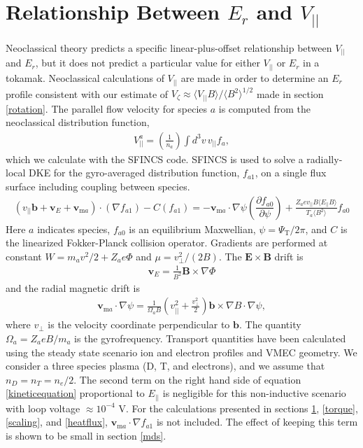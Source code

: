\documentclass[aip, pop, preprint]{revtex4-1}
\numberwithin{figure}{section}
\numberwithin{equation}{section}
\newcommand{\partder}[2]{\dfrac{\partial  #1}{\partial  #2}} %
\begin{document}
\FloatBarrier

\section{Relationship Between $E_r$ and $V_{||}$}\label{Erandv}
Neoclassical theory predicts a specific linear-plus-offset relationship between $V_{||}$ and $E_r$, but it does not predict a particular value for either $V_{||}$ or $E_r$ in a tokamak. Neoclassical calculations of $V_{||}$ are made in order to determine an $E_r$ profile consistent with our estimate of $V_{\zeta} \approx \langle V_{||} B \rangle/\langle B^2 \rangle^{1/2}$ made in section \ref{rotation}. The parallel flow velocity for species $a$ is computed from the neoclassical distribution function,
\begin{gather}
V^a_{||} = \left(\frac{1}{n_a}\right) \int d^3 v \, v_{||} f_a,
\label{eq:parallelflow}
\end{gather}
which we calculate with the SFINCS \cite{Landreman2014} code. SFINCS is used to solve a radially-local DKE for the gyro-averaged distribution function, $f_{a1}$, on a single flux surface including coupling between species. 
\begin{gather}
( v_{||} \bm{b} + \bm{v}_E + \bm{v}_{\mathrm{m}a}) \cdot (\nabla f_{a1})  - C(f_{a1}) = - \bm{v}_{\mathrm{m}a} \cdot \nabla \psi \left( \partder{f_{a0}}{\psi} \right) + \frac{Z_a e v_{||} B \langle E_{||} B \rangle}{T_a \langle B^2 \rangle } f_{a0}
\label{kineticequation}
\end{gather} 
\hspace{-1mm}
Here $a$ indicates species, $f_{a0}$ is an equilibrium Maxwellian, $\psi = \Psi_{\mathrm{T}}/2\pi$, and $C$ is the linearized Fokker-Planck collision operator. Gradients are performed at constant $W = m_a v^2/2 + Z_a e \Phi$ and $\mu = v_{\perp}^2/(2B)$. The $\bm{E} \times \bm{B}$ drift is 
\begin{gather}
\bm{v}_E = \frac{1}{B^2} \bm{B} \times \nabla \Phi
\end{gather} 
and the radial magnetic drift is
\begin{gather}
\bm{v}_{\mathrm{m}a} \cdot \nabla \psi = \frac{1}{\Omega_a B} \left(v_{||}^2 + \frac{v_{\perp}^2}{2} \right) \bm{b} \times \nabla B \cdot \nabla \psi,
\label{magneticdrift}
\end{gather} 
where $v_{\perp}$ is the velocity coordinate perpendicular to $\bm{b}$. The quantity $\Omega_a = Z_aeB/m_a$ is the gyrofrequency. Transport quantities have been calculated using the steady state scenario ion and electron profiles and VMEC geometry. We consider a three species plasma (D, T, and electrons), and we assume that $n_D = n_T = n_e/2$. The second term on the right hand side of equation \ref{kineticequation} proportional to $E_{||}$ is negligible for this non-inductive scenario with loop voltage $ \approx 10^{-4}$ V. For the calculations presented in sections \ref{Erandv}, \ref{torque}, \ref{scaling}, and \ref{heatflux}, $\bm{v}_{\mathrm{m}a} \cdot \nabla f_{a1}$ is not included. The effect of keeping this term is shown to be small in section \ref{mds}.
\end{document}

